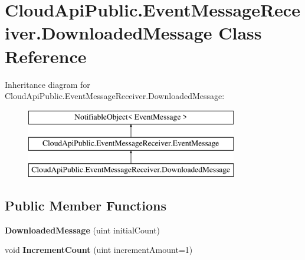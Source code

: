 \hypertarget{class_cloud_api_public_1_1_event_message_receiver_1_1_downloaded_message}{\section{Cloud\-Api\-Public.\-Event\-Message\-Receiver.\-Downloaded\-Message Class Reference}
\label{class_cloud_api_public_1_1_event_message_receiver_1_1_downloaded_message}
}
Inheritance diagram for Cloud\-Api\-Public.\-Event\-Message\-Receiver.\-Downloaded\-Message\-:\begin{figure}[H]
\begin{center}
\leavevmode
\includegraphics[height=3.000000cm]{class_cloud_api_public_1_1_event_message_receiver_1_1_downloaded_message}
\end{center}
\end{figure}
\subsection*{Public Member Functions}
\begin{DoxyCompactItemize}
\item 
\hypertarget{class_cloud_api_public_1_1_event_message_receiver_1_1_downloaded_message_a51a7eeaf249c5fbd86a52579466ab573}{{\bfseries Downloaded\-Message} (uint initial\-Count)}\label{class_cloud_api_public_1_1_event_message_receiver_1_1_downloaded_message_a51a7eeaf249c5fbd86a52579466ab573}

\item 
\hypertarget{class_cloud_api_public_1_1_event_message_receiver_1_1_downloaded_message_a5cd53d2caa9d1f60be6a73c0de13a3be}{void {\bfseries Increment\-Count} (uint increment\-Amount=1)}\label{class_cloud_api_public_1_1_event_message_receiver_1_1_downloaded_message_a5cd53d2caa9d1f60be6a73c0de13a3be}

\end{DoxyCompactItemize}

